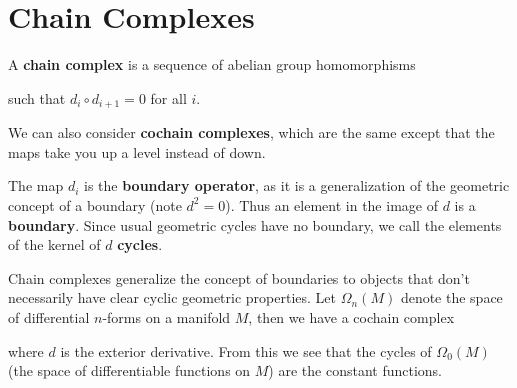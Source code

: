 \documentclass[twoside,10pt]{report}
\begin{document}
\tableofcontents


\section{Chain Complexes}

\begin{defn}[]
	A \textbf{chain complex} is a sequence of abelian group homomorphisms
\begin{center}
\end{center}
such that $d_i \circ d_{i+1}=0$ for all $i$.
\end{defn}

We can also consider \textbf{cochain complexes}, which are the same except that the maps take you up a level instead of down.
\begin{center}
\end{center}

The map $d_i$ is the \textbf{boundary operator}, as it is a generalization of the geometric concept of a boundary (note $d^2=0$). Thus an element in the image of $d$ is a \textbf{boundary}. Since usual geometric cycles have no boundary, we call the elements of the kernel of $d$ \textbf{cycles}.


\begin{ex}[]
	Chain complexes generalize the concept of boundaries to objects that don't necessarily have clear cyclic geometric properties. Let $\Omega_n(M)$ denote the space of differential $n$-forms on a manifold $M$, then we have a cochain complex
\begin{center}
\end{center}
where $d$ is the exterior derivative. From this we see that the cycles of $\Omega_0(M)$ (the space of differentiable functions on $M$) are the constant functions.
\end{ex}
\end{document}
